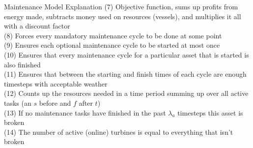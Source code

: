 \documentclass{beamer}
\begin{document}
\begin{frame}{Maintenance  Model Explanation}
\footnotesize
(7) Objective function, sums up profits from energy made, subtracts money used on resources (vessels), and multiplies it all with a discount factor	\\
(8) Forces every mandatory maintenance cycle to be done at some point	\\
(9) Ensures each optional maintenance cycle to be started at most once	\\
(10) Ensures that every maintenance cycle for a particular asset that is started is also finished	\\
(11) Ensures that between the starting and finish times of each cycle are enough timesteps with acceptable weather	\\
(12) Counts up the resources needed in a time period summing up over all active tasks (an $s$ before and $f$ after $t$)	\\
(13) If no maintenance tasks have finished in the past $\lambda_a$ timesteps this asset is broken	\\
(14) The number of active (online) turbines is equal to everything that isn't broken
\end{frame}
\end{document}
